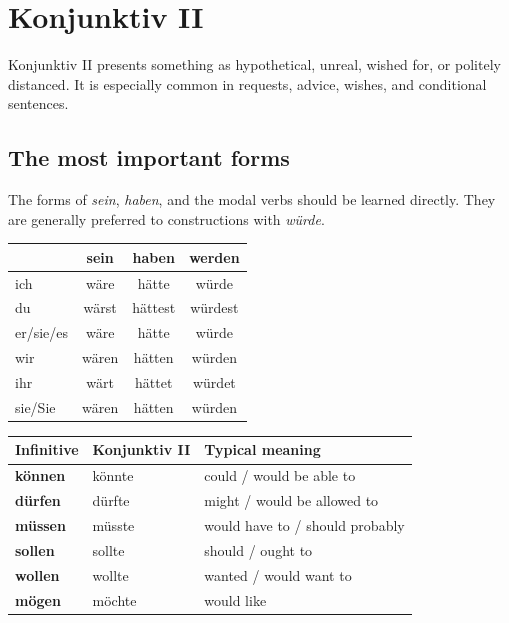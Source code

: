 \chapter{Konjunktiv II}

Konjunktiv II presents something as hypothetical, unreal, wished for, or
politely distanced. It is especially common in requests, advice, wishes, and
conditional sentences.

\section{The most important forms}

The forms of \textit{sein}, \textit{haben}, and the modal verbs should be
learned directly. They are generally preferred to constructions with
\textit{würde}.

\begin{center}
\small
{}
\begin{tabular}{@{}lccc@{}}
\toprule
 & sein & haben & werden \\
\midrule
ich & wäre & hätte & würde \\
du & wärst & hättest & würdest \\
er/sie/es & wäre & hätte & würde \\
wir & wären & hätten & würden \\
ihr & wärt & hättet & würdet \\
sie/Sie & wären & hätten & würden \\
\bottomrule
\end{tabular}
\end{center}

\begin{center}
\small
{}
\begin{tabularx}{\textwidth}{@{}>{\bfseries}l l X@{}}
\toprule
Infinitive & Konjunktiv II & Typical meaning \\
\midrule
können & könnte & could / would be able to \\
dürfen & dürfte & might / would be allowed to \\
müssen & müsste & would have to / should probably \\
sollen & sollte & should / ought to \\
wollen & wollte & wanted / would want to \\
mögen & möchte & would like \\
\bottomrule
\end{tabularx}
\end{center}

